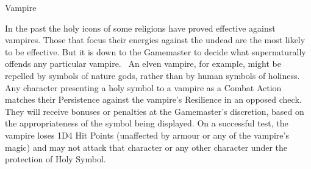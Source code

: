 \begin{monsterbox}{Vampire}
\begin{rpg-monsteraction}
		In the past the holy icons of some religions have proved effective against vampires. Those that focus their energies against the undead are the most likely to be effective. But it is down to the Gamemaster to decide what supernaturally offends any particular vampire.  An elven vampire, for example, might be repelled by symbols of nature gods, rather than by human symbols of holiness. Any character presenting a holy symbol to a vampire as a Combat Action matches their Persistence against the vampire’s Resilience in an opposed check. They will receive bonuses or penalties at the Gamemaster’s discretion, based on the appropriateness of the symbol being displayed. On a successful test, the vampire loses 1D4 Hit Points (unaffected by armour or any of the vampire’s magic) and may not attack that character or any other character under the protection of Holy Symbol.
	\end{rpg-monsteraction}
\end{monsterbox}
	
\newpage

\vphantom{.}\\
\vphantom{.}\\
\vphantom{.}\\
\vphantom{.}\\

